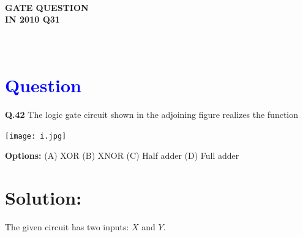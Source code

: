\documentclass[a4paper,12pt]{article}
\begin{document}
\pagestyle{empty} %

\thispagestyle{fancy} %
\fancyhf{} %
\renewcommand{\headrulewidth}{0pt} %


\vspace{1cm}
\begin{center}

    {\LARGE \textbf{\textcolor{darkskyblue}{\\  GATE QUESTION \\ IN 2010 Q31}}}
\end{center}

\vspace{-1cm} %
\section*{\textcolor{blue}{\\Question}}

\noindent\textbf{Q.42} The logic gate circuit shown in the adjoining figure realizes the function
\vspace{0.5cm}

\begin{center}
    \texttt{[image: i.jpg]}
\end{center}

\vspace{0.3cm}

\noindent\textbf{Options:}
\noindent
(A) XOR \hfill (B) XNOR \hfill (C) Half adder \hfill (D) Full adder
\section*{Solution:}

\vspace{0.5em}

The given circuit has two inputs: \( X \) and \( Y \).

\vspace{0.5em}
\end{document}

